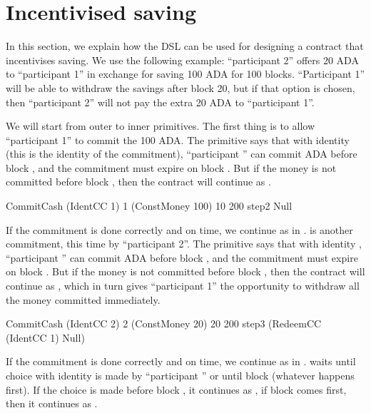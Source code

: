 \documentclass[
      acmsmall
    , screen
    , review=true
  ]{acmart}
\begin{document}
\section{Incentivised saving}

In this section, we explain how the DSL can be used for designing a contract that incentivises saving. We use the 
following example: ``participant 2'' offers 20 ADA to ``participant 1'' in exchange for saving 100 ADA for 100 blocks. 
``Participant 1'' will be able to withdraw the savings after block 20, but if that option is chosen, then ``participant 
2'' will not pay the extra 20 ADA to ``participant 1''.

We will start from outer to inner primitives. The first thing is to allow ``participant 1'' to commit the 100 ADA. The 
primitive says that with identity  (this is the identity of the commitment), ``participant 
'' can commit  ADA before block , and the commitment must 
expire on block . But if the money is not committed before block , then the 
contract will continue as .

\begin{haskellcode}
CommitCash (IdentCC 1) 1 (ConstMoney 100) 10 200
           step2
           Null
\end{haskellcode}

If the commitment is done correctly and on time, we continue as in .  is 
another commitment, this time by ``participant 2''. The primitive says that with identity ,
``participant '' can commit  ADA before block , and the commitment
must expire on block . But if the money is not committed before block , then the
contract will continue as , which in turn gives ``participant 1'' the 
opportunity to withdraw all the money committed immediately.

\begin{haskellcode}
CommitCash (IdentCC 2) 2 (ConstMoney 20) 20 200
           step3
           (RedeemCC (IdentCC 1) Null)
\end{haskellcode}

If the commitment is done correctly and on time, we continue as in . 
waits until choice with identity  is made by ``participant '' or
until block  (whatever happens first). If the choice is made before block , 
it continues as , if block  comes first, then it continues as 
.
\end{document}
